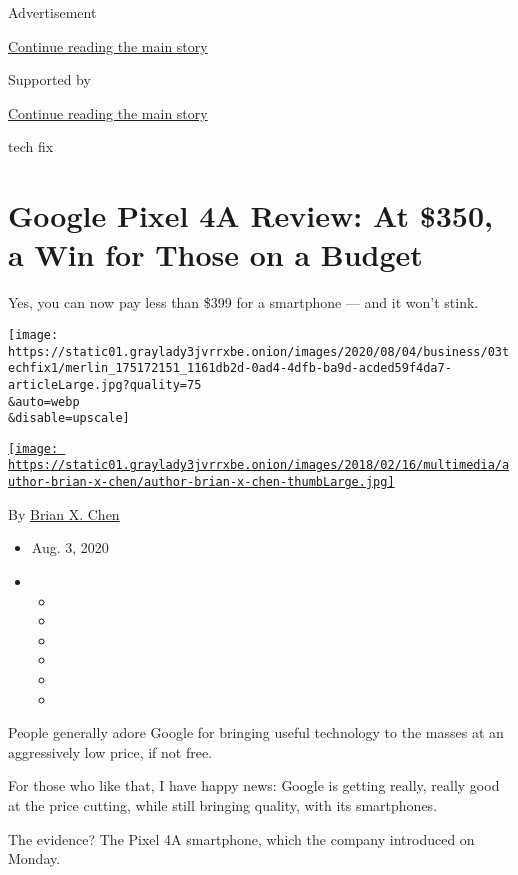 Advertisement

\protect\hyperlink{after-top}{Continue reading the main story}

Supported by

\protect\hyperlink{after-sponsor}{Continue reading the main story}

tech fix

\hypertarget{google-pixel-4a-review-at-350-a-win-for-those-on-a-budget}{%
\section{Google Pixel 4A Review: At \$350, a Win for Those on a
Budget}\label{google-pixel-4a-review-at-350-a-win-for-those-on-a-budget}}

Yes, you can now pay less than \$399 for a smartphone --- and it won't
stink.

\texttt{[image: https://static01.graylady3jvrrxbe.onion/images/2020/08/04/business/03techfix1/merlin\_175172151\_1161db2d-0ad4-4dfb-ba9d-acded59f4da7-articleLarge.jpg?quality=75\\\&auto=webp\\\&disable=upscale]}

\href{https://www.nytimes3xbfgragh.onion/by/brian-x-chen}{\texttt{[image: https://static01.graylady3jvrrxbe.onion/images/2018/02/16/multimedia/author-brian-x-chen/author-brian-x-chen-thumbLarge.jpg]}}

By \href{https://www.nytimes3xbfgragh.onion/by/brian-x-chen}{Brian X.
Chen}

\begin{itemize}
\item
  Aug. 3, 2020
\item
  \begin{itemize}
  \item
  \item
  \item
  \item
  \item
  \item
  \end{itemize}
\end{itemize}

People generally adore Google for bringing useful technology to the
masses at an aggressively low price, if not free.

For those who like that, I have happy news: Google is getting really,
really good at the price cutting, while still bringing quality, with its
smartphones.

The evidence? The Pixel 4A smartphone, which the company introduced on
Monday.

